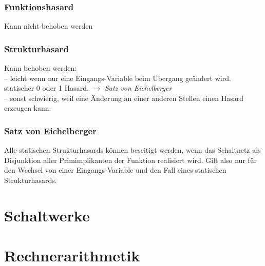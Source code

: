 \documentclass[a4paper]{scrartcl}
\begin{document}
			\subsubsection{Funktionshasard}
			Kann nicht behoben werden
			
			\subsubsection{Strukturhasard}
			Kann behoben werden:\\
			-- leicht wenn nur eine Eingangs-Variable beim Übergang geändert wird. statischer 0 oder 1 Hasard. \( \rightarrow \) \emph{Satz von Eichelberger} \\
			-- sonst schwierig, weil eine Änderung an einer anderen Stellen einen Hasard erzeugen kann.\\
		
		\subsubsection{Satz von Eichelberger}
		Alle statischen Strukturhasards können beseitigt werden, wenn das Schaltnetz als Disjunktion aller Primimplikanten der Funktion realisiert wird. Gilt also nur für den Wechsel von einer Eingangs-Variable und den Fall eines statischen Strukturhasards.
		
	\section{Schaltwerke}
	
	\section{Rechnerarithmetik}
	
\end{document}
